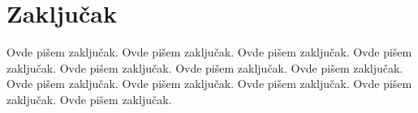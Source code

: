 \documentclass[a4paper]{article}
\begin{document}
\section{Zaključak}
\label{sec:zakljucak}

Ovde pišem zaključak. 
Ovde pišem zaključak. 
Ovde pišem zaključak. 
Ovde pišem zaključak. 
Ovde pišem zaključak. 
Ovde pišem zaključak. 
Ovde pišem zaključak. 
Ovde pišem zaključak. 
Ovde pišem zaključak. 
Ovde pišem zaključak. 
Ovde pišem zaključak. 
Ovde pišem zaključak. 


\appendix
 

\end{document}
